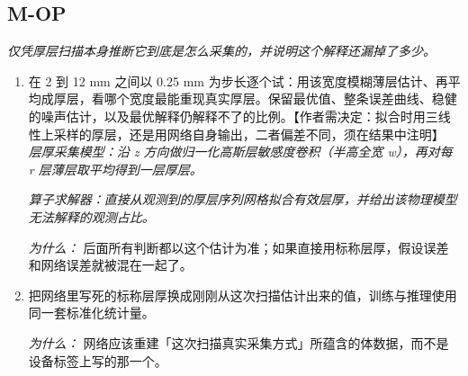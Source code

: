 \documentclass[10pt,a4paper]{article}
\begin{document}
\subsection*{M-OP}
\emph{仅凭厚层扫描本身推断它到底是怎么采集的，并说明这个解释还漏掉了多少。}
\begin{enumerate}[leftmargin=*,start=1]
  \item 在 2 到 12 mm 之间以 0.25 mm 为步长逐个试：用该宽度模糊薄层估计、再平均成厚层，看哪个宽度最能重现真实厚层。保留最优值、整条误差曲线、稳健的噪声估计，以及最优解释仍解释不了的比例。【作者需决定：拟合时用三线性上采样的厚层，还是用网络自身输出，二者偏差不同，须在结果中注明】
\noindent\emph{层厚采集模型：沿 z 方向做归一化高斯层敏感度卷积（半高全宽 w），再对每 r 层薄层取平均得到一层厚层。}
\par{}
\noindent\emph{算子求解器：直接从观测到的厚层序列网格拟合有效层厚，并给出该物理模型无法解释的观测占比。}
\par{}
\par\emph{为什么：} 后面所有判断都以这个估计为准；如果直接用标称层厚，假设误差和网络误差就被混在一起了。
  \item 把网络里写死的标称层厚换成刚刚从这次扫描估计出来的值，训练与推理使用同一套标准化统计量。
\par\emph{为什么：} 网络应该重建「这次扫描真实采集方式」所蕴含的体数据，而不是设备标签上写的那一个。
\end{enumerate}
\end{document}
